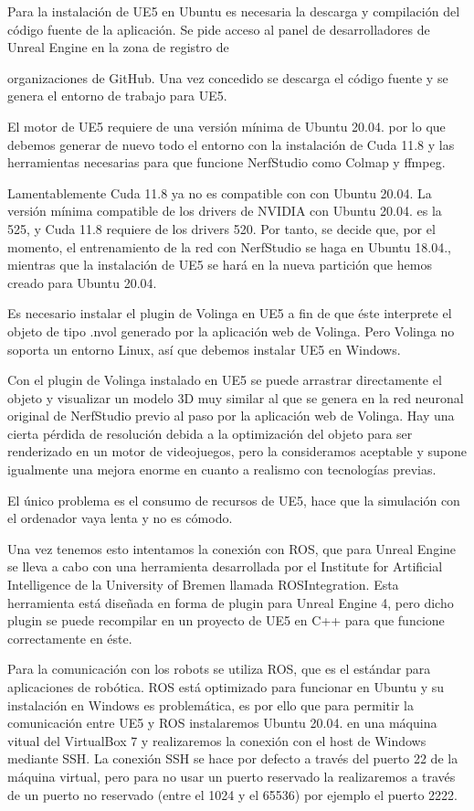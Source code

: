 \documentclass[a4paper, 12pt, spanish, twoside]{article}
\begin{document}
Para la instalación de UE5 en Ubuntu es necesaria la descarga y compilación del código fuente de la aplicación. Se pide acceso al panel de desarrolladores de Unreal Engine en la zona de registro de

organizaciones de GitHub. Una vez concedido se descarga el código fuente y se genera el entorno de trabajo para UE5.

El motor de UE5 requiere de una versión mínima de Ubuntu 20.04. por lo que debemos generar de nuevo todo el entorno con la instalación de Cuda 11.8 y las herramientas necesarias para que funcione NerfStudio como Colmap y ffmpeg.

Lamentablemente Cuda 11.8 ya no es compatible con con Ubuntu 20.04. La versión mínima compatible de los drivers de NVIDIA con Ubuntu 20.04. es la 525, y Cuda 11.8 requiere de los drivers 520. Por tanto, se decide que, por el momento, el entrenamiento de la red con NerfStudio se haga en Ubuntu 18.04., mientras que la instalación de UE5 se hará en la nueva partición que hemos creado para Ubuntu 20.04.

Es necesario instalar el plugin de Volinga en UE5 a fin de que éste interprete el objeto de tipo .nvol generado por la aplicación web de Volinga. Pero Volinga no soporta un entorno Linux, así que debemos instalar UE5 en Windows.

Con el plugin de Volinga instalado en UE5 se puede arrastrar directamente el objeto y visualizar un modelo 3D muy similar al que se genera en la red neuronal original de NerfStudio previo al paso por la aplicación web de Volinga. Hay una cierta pérdida de resolución debida a la optimización del objeto para ser renderizado en un motor de videojuegos, pero la consideramos aceptable y supone igualmente una mejora enorme en cuanto a realismo con tecnologías previas.

El único problema es el consumo de recursos de UE5, hace que la simulación con el ordenador vaya lenta y no es cómodo.

Una vez tenemos esto intentamos la conexión con ROS, que para Unreal Engine se lleva a cabo con una herramienta desarrollada por el Institute for Artificial Intelligence de la University of Bremen llamada ROSIntegration. Esta herramienta está diseñada en forma de plugin para Unreal Engine 4, pero dicho plugin se puede recompilar en un proyecto de UE5 en C++ para que funcione correctamente en éste.

Para la comunicación con los robots se utiliza ROS, que es el estándar para aplicaciones de robótica. ROS está optimizado para funcionar en Ubuntu y su instalación en Windows es problemática, es por ello que para permitir la comunicación entre UE5 y ROS instalaremos Ubuntu 20.04. en una máquina vitual del VirtualBox 7 y realizaremos la conexión con el host de Windows mediante SSH. La conexión SSH se hace por defecto a través del puerto 22 de la máquina virtual, pero para no usar un puerto reservado la realizaremos a través de un puerto no reservado (entre el 1024 y el 65536) por ejemplo el puerto 2222.
\end{document}
